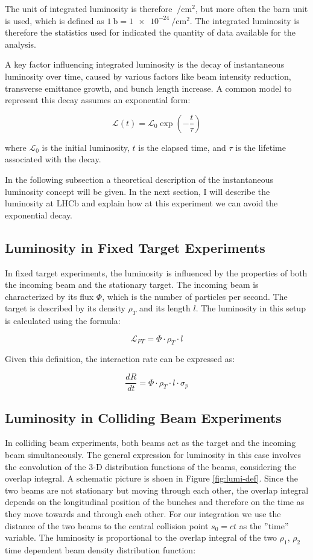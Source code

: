 The unit of integrated luminosity is therefore $\SI{}{\per\centi\meter\squared}$, but more often the barn unit is used, which is defined as $\SI{1}{\barn}=\SI{1e-24}{\per\centi\meter\squared}$. The integrated luminosity is therefore the statistics used for indicated the quantity of data available for the analysis.

A key factor influencing integrated luminosity is the decay of instantaneous luminosity over time, caused by various factors like beam intensity reduction, transverse emittance growth, and bunch length increase. A common model to represent this decay assumes an exponential form:

\begin{equation}
\mathcal{L}(t) = \mathcal{L}_0 \exp\left( -\frac{t}{\tau} \right)
\end{equation}

where $\mathcal{L}_0$ is the initial luminosity, \(t\) is the elapsed time, and \(\tau\) is the lifetime associated with the decay. 

In the following subsection a theoretical description of the instantaneous luminosity concept will be given.
In the next section, I will describe the luminosity at LHCb and explain how at this experiment we can avoid the exponential decay.

\subsection{Luminosity in Fixed Target Experiments}
In fixed target experiments, the luminosity is influenced by the properties of both the incoming beam and the stationary target. The incoming beam is characterized by its flux $\Phi$, which is the number of particles per second. The target is described by its density $\rho_T$ and its length $l$. The luminosity in this setup is calculated using the formula:

\[
\mathcal{L}_{FT} = \Phi \cdot \rho_T \cdot l
\]

Given this definition, the interaction rate can be expressed as:

\[
\frac{dR}{dt} = \Phi \cdot \rho_T \cdot l \cdot \sigma_p
\]

\subsection{Luminosity in Colliding Beam Experiments}
In colliding beam experiments, both beams act as the target and the incoming beam simultaneously. The general expression for luminosity in this case involves the convolution of the 3-D distribution functions of the beams, considering the overlap integral. A schematic picture is shoen in Figure \ref{fig:lumi-def}\cite{Herr:941318}. Since the two beams are not stationary but moving through each other, the overlap integral depends on the longitudinal position of the bunches and therefore on the time as they move towards and through each other. For our integration we use the distance of the two beams to the central collision point $s_0 = ct$ as the ”time” variable. 
The luminosity is proportional to the overlap integral of the two  $\rho_1$, $\rho_2$ time dependent beam density distribution function:

